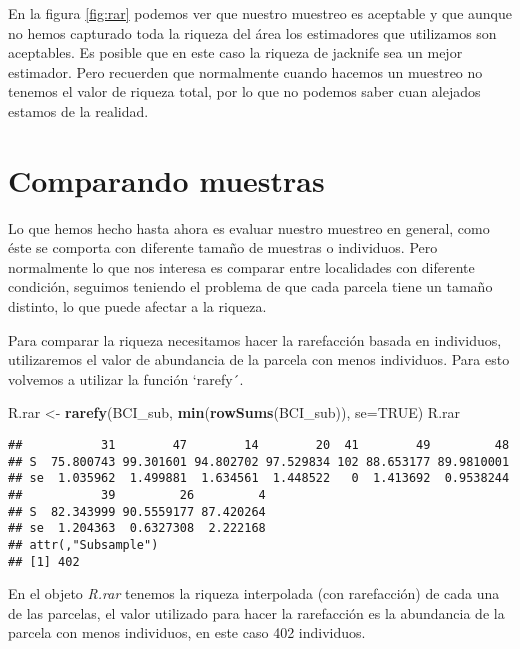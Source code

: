 \documentclass[]{book}
\newenvironment{Shaded}{\begin{snugshade}}{\end{snugshade}}
\newcommand{\KeywordTok}[1]{\textcolor[rgb]{0.13,0.29,0.53}{\textbf{{#1}}}}
\newcommand{\DataTypeTok}[1]{\textcolor[rgb]{0.13,0.29,0.53}{{#1}}}
\newcommand{\StringTok}[1]{\textcolor[rgb]{0.31,0.60,0.02}{{#1}}}
\newcommand{\OtherTok}[1]{\textcolor[rgb]{0.56,0.35,0.01}{{#1}}}
\newcommand{\NormalTok}[1]{{#1}}
\begin{document}
En la figura \ref{fig:rar} podemos ver que nuestro muestreo es aceptable
y que aunque no hemos capturado toda la riqueza del área los estimadores
que utilizamos son aceptables. Es posible que en este caso la riqueza de
jacknife sea un mejor estimador. Pero recuerden que normalmente cuando
hacemos un muestreo no tenemos el valor de riqueza total, por lo que no
podemos saber cuan alejados estamos de la realidad.

\chapter{Comparando muestras}\label{comparando-muestras}

Lo que hemos hecho hasta ahora es evaluar nuestro muestreo en general,
como éste se comporta con diferente tamaño de muestras o individuos.
Pero normalmente lo que nos interesa es comparar entre localidades con
diferente condición, seguimos teniendo el problema de que cada parcela
tiene un tamaño distinto, lo que puede afectar a la riqueza.

Para comparar la riqueza necesitamos hacer la rarefacción basada en
individuos, utilizaremos el valor de abundancia de la parcela con menos
individuos. Para esto volvemos a utilizar la función `rarefy´.

\begin{Shaded}
\begin{Highlighting}[]
\NormalTok{R.rar <-}\StringTok{ }\KeywordTok{rarefy}\NormalTok{(BCI_sub, }\KeywordTok{min}\NormalTok{(}\KeywordTok{rowSums}\NormalTok{(BCI_sub)), }\DataTypeTok{se=}\OtherTok{TRUE}\NormalTok{)}
\NormalTok{R.rar}
\end{Highlighting}
\end{Shaded}

\begin{verbatim}
##           31        47        14        20  41        49         48
## S  75.800743 99.301601 94.802702 97.529834 102 88.653177 89.9810001
## se  1.035962  1.499881  1.634561  1.448522   0  1.413692  0.9538244
##           39         26         4
## S  82.343999 90.5559177 87.420264
## se  1.204363  0.6327308  2.222168
## attr(,"Subsample")
## [1] 402
\end{verbatim}

En el objeto \emph{R.rar} tenemos la riqueza interpolada (con
rarefacción) de cada una de las parcelas, el valor utilizado para hacer
la rarefacción es la abundancia de la parcela con menos individuos, en
este caso 402 individuos.
\end{document}
